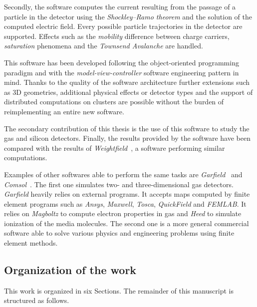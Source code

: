 \documentclass[11pt]{article}
\begin{document}
		Secondly, the software computes the current resulting from the passage of a particle
		in the detector using the \textit{Shockley–Ramo theorem} and the solution of the
		computed electric field. Every possible particle trajectories in the detector
		are supported. Effects such as the \textit{mobility} difference between
		charge carriers, \textit{saturation} phenomena and the
		\textit{Townsend Avalanche} are handled.

		This software has been developed following the object-oriented
		programming paradigm and with the \textit{model-view-controller}
		software engineering pattern in mind. Thanks to the quality of the software
		architecture further extensions such as 3D geometries, additional physical effects or
		detector types and the support of distributed computations on clusters are possible
		without the burden of reimplementing an entire new software.

		The secondary contribution of this thesis is the use of this software to study
		the gas and silicon detectors. Finally, the results provided by the
		software have been compared with the results of \textit{Weightfield}~\cite{Cenna2015}, a
		software performing similar computations.

		Examples of other softwares able to perform the same tasks are
		\textit{Garfield}~\cite{garfield}	and \textit{Comsol}~\cite{comsol}.
		The first one simulates two- and three-dimensional gas detectors.
		\textit{Garfield} heavily relies on external programs.
		It accepts maps computed by finite element programs such as \textit{Ansys},
		\textit{Maxwell}, \textit{Tosca}, \textit{QuickField} and \textit{FEMLAB}.
		It relies on \textit{Magboltz} to compute electron properties in gas and
		\textit{Heed} to simulate ionization of the media molecules.
		The second one is a more general commercial software able to solve various physics and
		engineering problems using finite element methods.

	\subsection*{Organization of the work}

		This work is organized in six Sections. The remainder of this manuscript
		is structured as follows.
\end{document}
